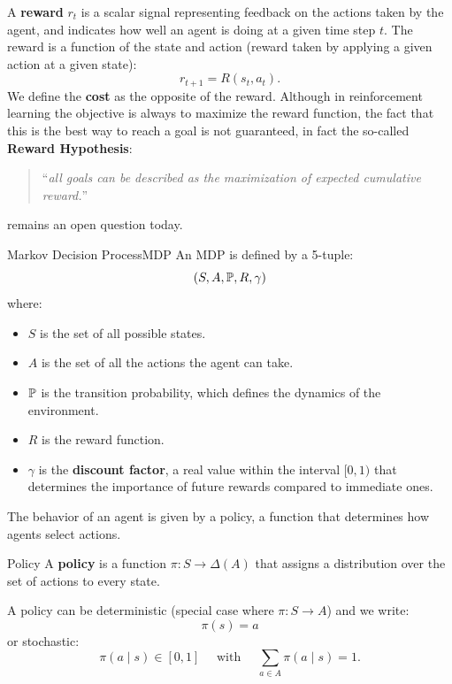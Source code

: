 \documentclass[10pt, a4paper]{report}
\begin{document}
A \textbf{reward} $r_t$ is a scalar signal representing feedback on the actions taken by the agent, and indicates how well an agent is doing at a given time step $t$. The reward is a function of the state and action (reward taken by applying a given action at a given state):\begin{equation}
    r_{t+1}=R(s_t,a_t).
\end{equation} 
We define the \textbf{cost} as the opposite of the reward. Although in reinforcement learning the objective is always to maximize the reward function, the fact that this is the best way to reach a goal is not guaranteed, in fact the so-called \textbf{Reward Hypothesis}:
\begin{quote}
``\textit{all goals can be described as the maximization of expected cumulative reward.}''
\end{quote}
remains an open question today.
\begin{boxdefinition}{Markov Decision Process}{MDP}
    An MDP is defined by a 5-tuple:\begin{equation}
        (S,A,{\mathbb P},R,\gamma) 
    \end{equation}
    where:\begin{itemize}
        \item $S$ is the set of all possible states.
        \item $A$ is the set of all the actions the agent can take.
        \item ${\mathbb P}$ is the transition probability, which defines the dynamics of the environment.
        \item $R$ is the reward function.
        \item $\gamma$ is the \textbf{discount factor}, a real value within the interval $[0, 1)$ that determines the importance of future rewards compared to immediate ones.
    \end{itemize}
\end{boxdefinition}
\noindent The behavior of an agent is given by a policy, a function that determines how agents select actions.
\begin{boxdefinition}{Policy}{}
    A \textbf{policy} is a function $\pi:S\to \Delta(A)$ that assigns a distribution over the set of actions to every state.
\end{boxdefinition}
\noindent A policy can be deterministic (special case where $\pi:S\to A$) and we write:\begin{equation}
    \pi(s)=a
\end{equation}
\noindent or stochastic:\begin{equation}
    \pi(a \mid s)\in [0,1] \quad \text{ with } \quad \sum_{a\in A}\pi(a \mid s)=1.
\end{equation}
\end{document}
